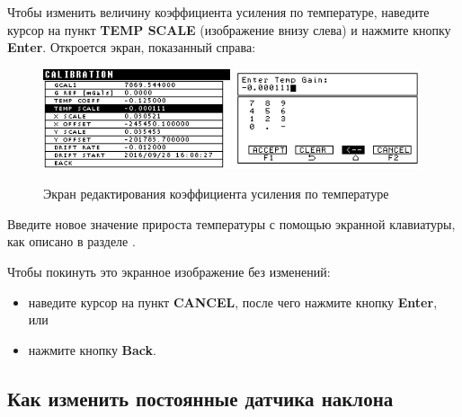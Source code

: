 Чтобы изменить величину коэффициента усиления по температуре, наведите курсор на
пункт \textbf{TEMP SCALE} (изображение внизу слева) и нажмите кнопку
\textbf{Enter}.  Откроется экран, показанный справа:

\begin{figure}[H]
  \centering
  \includegraphics[width=0.49\textwidth]{figures/the_temperature_gain_editing_screen_1}
  \includegraphics[width=0.49\textwidth]{figures/the_temperature_gain_editing_screen_2}
  \caption{Экран редактирования коэффициента усиления по температуре}
  \label{fig:the_temperature_gain_editing_screen}
\end{figure}

Введите новое значение прироста температуры с помощью экранной клавиатуры,
как описано в разделе .

Чтобы покинуть это экранное изображение без изменений:
\begin{itemize}
  \item наведите курсор на пункт \textbf{CANCEL}, после чего нажмите кнопку
    \textbf{Enter}, или

  \item нажмите кнопку \textbf{Back}.
\end{itemize}

\subsection{Как изменить постоянные датчика наклона}



